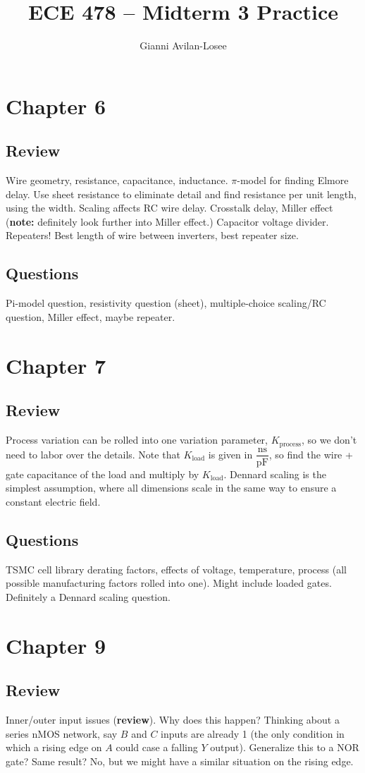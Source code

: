 \documentclass{article}
\title{ECE 478 -- Midterm 3 Practice}
\author{Gianni Avilan-Losee}
\begin{document}
\setcounter{section}{5}
\section{Chapter 6}
\subsection{Review}
Wire geometry, resistance, capacitance, inductance. 
\(\pi\)-model for finding Elmore delay. Use sheet resistance to eliminate detail and find resistance per unit length, using the width. Scaling affects RC wire delay. Crosstalk delay, Miller effect (\textbf{note:} definitely look further into Miller effect.) Capacitor voltage divider. Repeaters! Best length of wire between inverters, best repeater size. 
\subsection{Questions}
Pi-model question, resistivity question (sheet), multiple-choice scaling/RC question, Miller effect, maybe repeater.
\section{Chapter 7}
\subsection{Review}
Process variation can be rolled into one variation parameter, \(K_{\mathrm{process}}\), so we don't need to labor over the details. Note that \(K_{\mathrm{load}}\) is given in \(\mathrm{\dfrac{ns}{pF}}\), so find the wire + gate capacitance of the load and multiply by \(K_{\mathrm{load}}\). Dennard scaling is the simplest assumption, where all dimensions scale in the same way to ensure a constant electric field. 
\subsection{Questions}
TSMC cell library derating factors, effects of voltage, temperature, process (all possible manufacturing factors rolled into one). Might include loaded gates. Definitely a Dennard scaling question.
\section{Chapter 9}
\subsection{Review}
Inner/outer input issues (\textbf{review}). Why does this happen? Thinking about a series nMOS network, say \(B\) and \(C\) inputs are already 1 (the only condition in which a rising edge on \(A\) could case a falling \(Y\) output). Generalize this to a NOR gate? Same result? No, but we might have a similar situation on the rising edge.
\end{document}
